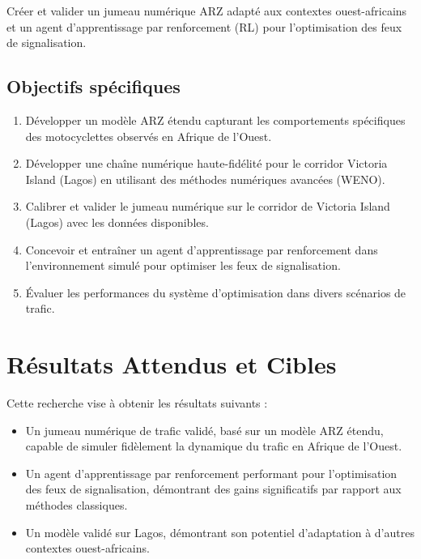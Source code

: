 Créer et valider un jumeau numérique ARZ adapté aux contextes ouest-africains et un agent d'apprentissage par renforcement (RL) pour l'optimisation des feux de signalisation.

\subsection{Objectifs spécifiques}
\label{subsec:objectifs_specifiques}

\begin{enumerate}
    \item Développer un modèle ARZ étendu capturant les comportements spécifiques des motocyclettes observés en Afrique de l'Ouest.
    \item Développer une chaîne numérique haute-fidélité pour le corridor Victoria Island (Lagos) en utilisant des méthodes numériques avancées (WENO).
    \item Calibrer et valider le jumeau numérique sur le corridor de Victoria Island (Lagos) avec les données disponibles.
    \item Concevoir et entraîner un agent d'apprentissage par renforcement dans l'environnement simulé pour optimiser les feux de signalisation.
    \item Évaluer les performances du système d'optimisation dans divers scénarios de trafic.
\end{enumerate}

\section{Résultats Attendus et Cibles}
\label{sec:resultats_attendus}

Cette recherche vise à obtenir les résultats suivants :
\begin{itemize}
    \item Un jumeau numérique de trafic validé, basé sur un modèle ARZ étendu, capable de simuler fidèlement la dynamique du trafic en Afrique de l'Ouest.
    \item Un agent d'apprentissage par renforcement performant pour l'optimisation des feux de signalisation, démontrant des gains significatifs par rapport aux méthodes classiques.
    \item Un modèle validé sur Lagos, démontrant son potentiel d'adaptation à d'autres contextes ouest-africains.
\end{itemize}

